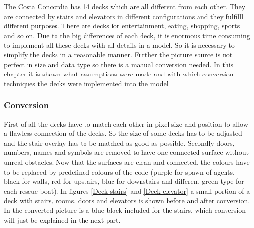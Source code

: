 \documentclass[11pt]{article}
\begin{document}
The Costa Concordia has 14 decks which are all different from each other. They are connected by stairs and elevators in different configurations and they fulfilll different purposes. There are decks for entertainment, eating, shopping, sports and so on.
Due to the big differences of each deck, it is enormous time consuming to implement all these decks with all details in a model. So it is necessary to simplify the decks in a reasonable manner.
Further the picture source is not perfect in size and data type so there is a manual conversion needed.
In this chapter it is shown what assumptions were made and with which conversion techniques the decks were implemented into the model.

\subsubsection{Conversion}
First of all the decks have to match each other in pixel size and position to allow a flawless connection of the decks. So the size of some decks has to be adjusted and the stair overlay has to be matched as good as possible.
Secondly doors, numbers, names and symbols are removed to have one connected surface without unreal obstacles.
\newline
Now that the surfaces are clean and connected, the colours have to be replaced by predefined colours of the code (purple for spawn of agents, black for walls, red for upstairs, blue for downstairs and different green type for each rescue boat).
\newline
In figures \ref{Deck-stairs} and \ref{Deck-elevator} a small portion of a deck with stairs, rooms, doors and elevators is shown before and after conversion. In the converted picture is a blue block included for the stairs, which conversion will just be explained in the next part.
\end{document}
